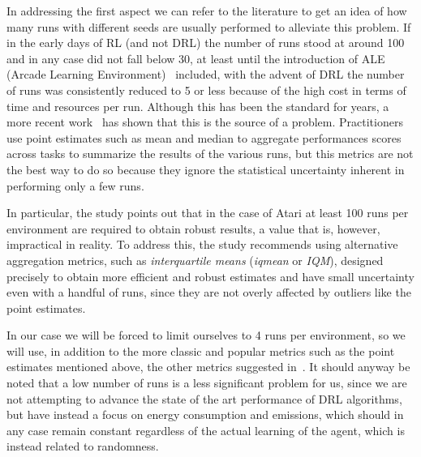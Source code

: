 In addressing the first aspect we can refer to the literature to get an idea of how many runs with different seeds are usually performed to alleviate this problem. If in the early days of RL (and not DRL) the number of runs stood at around 100 and in any case did not fall below 30, at least until the introduction of ALE (Arcade Learning Environment)~\cite{bellemare:ale} included, with the advent of DRL the number of runs was consistently reduced to 5 or less because of the high cost in terms of time and resources per run. Although this has been the standard for years, a more recent work~\cite{agarwal:statistical_precipice} has shown that this is the source of a problem. Practitioners use point estimates such as mean and median to aggregate performances  scores across tasks to summarize the results of the various runs, but this metrics are not the best way to do so because they ignore the statistical uncertainty inherent in performing only a few runs.

In particular, the study points out that in the case of Atari at least 100 runs per environment are required to obtain robust results, a value that is, however, impractical in reality. To address this, the study recommends using alternative aggregation metrics, such as \emph{interquartile means} (\emph{iqmean} or \emph{IQM}), designed precisely to obtain more efficient and robust estimates and have small uncertainty even with a handful of runs, since they are not overly affected by outliers like the point estimates.

In our case we will be forced to limit ourselves to 4 runs per environment, so we will use, in addition to the more classic and popular metrics such as the point estimates mentioned above, the other metrics suggested in~\cite{agarwal:statistical_precipice}.  It should anyway be noted that a low number of runs is a less significant problem for us, since we are not attempting to advance the state of the art performance of DRL algorithms, but have instead a focus on energy consumption and emissions, which should in any case remain constant regardless of the actual learning of the agent, which is instead related to randomness.

